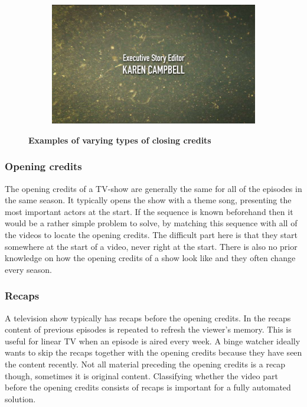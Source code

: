 \documentclass{article}
\begin{document}
\begin{figure}[H]
\begin{subfigure}[b]{0.4\textwidth}
\end{subfigure}
\begin{subfigure}[b]{0.4\textwidth}
	\includegraphics[width=\textwidth]{images/diffcredits2.png}
\end{subfigure}
  \caption{\textbf{Examples of varying types of closing credits}}
  \label{closingcredits}
\end{figure}

\subsubsection{Opening credits}
The opening credits of a TV-show are generally the same for all of the episodes in the same season. It typically opens the show with a theme song, presenting the most important actors at the start. If the sequence is known beforehand then it would be a rather simple problem to solve, by matching this sequence with all of the videos to locate the opening credits. The difficult part here is that they start somewhere at the start of a video, never right at the start. There is also no prior knowledge on how the opening credits of a show look like and they often change every season.

\subsubsection{Recaps}
A television show typically has recaps before the opening credits. In the recaps content of previous episodes is repeated to refresh the viewer's memory. This is useful for linear TV when an episode is aired every week. A binge watcher ideally wants to skip the recaps together with the opening credits because they have seen the content recently. Not all material preceding the opening credits is a recap though, sometimes it is original content. Classifying whether the video part before the opening credits consists of recaps is important for a fully automated solution.
\end{document}
